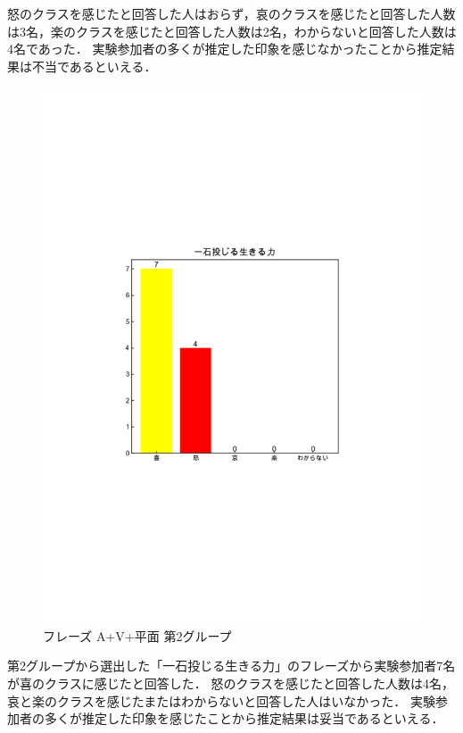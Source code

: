 怒のクラスを感じたと回答した人はおらず，哀のクラスを感じたと回答した人数は3名，楽のクラスを感じたと回答した人数は2名，わからないと回答した人数は4名であった．
実験参加者の多くが推定した印象を感じなかったことから推定結果は不当であるといえる．
\begin{figure}[H]
    \centering
    \includegraphics[width=14cm]{432.pdf}
    \vspace{-1mm}
    \caption{フレーズ A+V+平面 第2グループ}
    \label{fig:mms}
    \vspace{5mm}
\end{figure}
第2グループから選出した「一石投じる生きる力」のフレーズから実験参加者7名が喜のクラスに感じたと回答した．
怒のクラスを感じたと回答した人数は4名，哀と楽のクラスを感じたまたはわからないと回答した人はいなかった．
実験参加者の多くが推定した印象を感じたことから推定結果は妥当であるといえる．
\newpage
